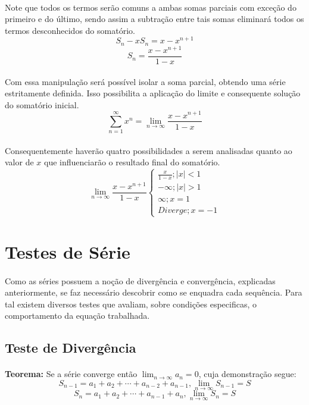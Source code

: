 \documentclass{article}
\begin{document}
\begin{enumerate}[rightmargin = \leftmargin]
        \paragraph{}Note que todos os termos serão comuns a ambas somas parciais com exceção do primeiro e do último, sendo assim a subtração entre tais somas eliminará todos os termos desconhecidos do somatório.
            \[S_n-xS_n=x-x^{n+1}\]
            \[S_n=\frac{x-x^{n+1}}{1-x}\]
        \paragraph{}Com essa manipulação será possível isolar a soma parcial, obtendo uma série estritamente definida. Isso possibilita a aplicação do limite e consequente solução do somatório inicial.
            \[\sum\limits_{n=1}^{\infty} x^n = \lim\limits_{n\to\infty}\frac{x-x^{n+1}}{1-x}\]
        \paragraph{}Consequentemente haverão quatro possibilidades a serem analisadas quanto ao valor de $x$ que influenciarão o resultado final do somatório.
            \[\lim\limits_{n\to\infty}\frac{x-x^{n+1}}{1-x}\left \{ \begin{matrix} \frac{x}{1-x}; |x|<1\\ -\infty; |x|>1\\ \infty; x=1\\ Diverge; x=-1\end{matrix}\right.\]
        
\section{Testes de Série}
    \paragraph{}Como as séries possuem a noção de divergência e convergência, explicadas anteriormente, se faz necessário descobrir como se enquadra cada sequência. Para tal existem diversos testes que avaliam, sobre condições especificas, o comportamento da equação trabalhada.
    
    \subsection{Teste de Divergência}
        \paragraph{}\textbf{Teorema:} Se a série converge então $\lim_{n\to\infty}a_{n} = 0$, cuja demonstração segue:
            \[S_{n-1}=a_{1}+a_{2}+\cdots+a_{n-2}+a_{n-1}, \lim_{n\to\infty}S_{n-1} = S\]
            \[S_{n}=a_{1}+a_{2}+\cdots+a_{n-1}+a_{n}, \lim_{n\to\infty}S_{n} = S\]

\end{enumerate}
\end{document}
